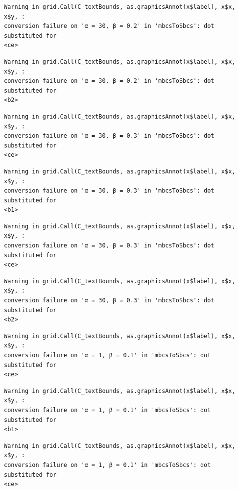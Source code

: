 \documentclass[
  spanish,
  a4paper,
]{scrreport}
\theoremstyle{plain}
\theoremstyle{definition}
\theoremstyle{definition}
\theoremstyle{remark}
\begin{document}
\begin{verbatim}
Warning in grid.Call(C_textBounds, as.graphicsAnnot(x$label), x$x, x$y, :
conversion failure on 'α = 30, β = 0.2' in 'mbcsToSbcs': dot substituted for
<ce>
\end{verbatim}

\begin{verbatim}
Warning in grid.Call(C_textBounds, as.graphicsAnnot(x$label), x$x, x$y, :
conversion failure on 'α = 30, β = 0.2' in 'mbcsToSbcs': dot substituted for
<b2>
\end{verbatim}

\begin{verbatim}
Warning in grid.Call(C_textBounds, as.graphicsAnnot(x$label), x$x, x$y, :
conversion failure on 'α = 30, β = 0.3' in 'mbcsToSbcs': dot substituted for
<ce>
\end{verbatim}

\begin{verbatim}
Warning in grid.Call(C_textBounds, as.graphicsAnnot(x$label), x$x, x$y, :
conversion failure on 'α = 30, β = 0.3' in 'mbcsToSbcs': dot substituted for
<b1>
\end{verbatim}

\begin{verbatim}
Warning in grid.Call(C_textBounds, as.graphicsAnnot(x$label), x$x, x$y, :
conversion failure on 'α = 30, β = 0.3' in 'mbcsToSbcs': dot substituted for
<ce>
\end{verbatim}

\begin{verbatim}
Warning in grid.Call(C_textBounds, as.graphicsAnnot(x$label), x$x, x$y, :
conversion failure on 'α = 30, β = 0.3' in 'mbcsToSbcs': dot substituted for
<b2>
\end{verbatim}

\begin{verbatim}
Warning in grid.Call(C_textBounds, as.graphicsAnnot(x$label), x$x, x$y, :
conversion failure on 'α = 1, β = 0.1' in 'mbcsToSbcs': dot substituted for
<ce>
\end{verbatim}

\begin{verbatim}
Warning in grid.Call(C_textBounds, as.graphicsAnnot(x$label), x$x, x$y, :
conversion failure on 'α = 1, β = 0.1' in 'mbcsToSbcs': dot substituted for
<b1>
\end{verbatim}

\begin{verbatim}
Warning in grid.Call(C_textBounds, as.graphicsAnnot(x$label), x$x, x$y, :
conversion failure on 'α = 1, β = 0.1' in 'mbcsToSbcs': dot substituted for
<ce>
\end{verbatim}
\end{document}
